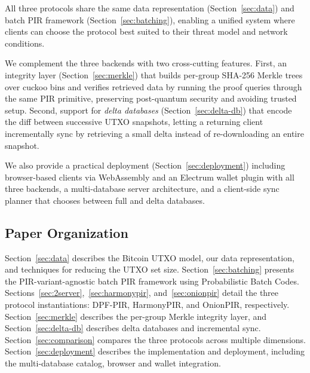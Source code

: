 All three protocols share the same data representation (Section~\ref{sec:data}) and batch PIR framework (Section~\ref{sec:batching}), enabling a unified system where clients can choose the protocol best suited to their threat model and network conditions.

We complement the three backends with two cross-cutting features. First, an integrity layer (Section~\ref{sec:merkle}) that builds per-group SHA-256 Merkle trees over cuckoo bins and verifies retrieved data by running the proof queries through the same PIR primitive, preserving post-quantum security and avoiding trusted setup. Second, support for \emph{delta databases} (Section~\ref{sec:delta-db}) that encode the diff between successive UTXO snapshots, letting a returning client incrementally sync by retrieving a small delta instead of re-downloading an entire snapshot.

We also provide a practical deployment (Section~\ref{sec:deployment}) including browser-based clients via WebAssembly \cite{wasm} and an Electrum wallet plugin \cite{electrum} with all three backends, a multi-database server architecture, and a client-side sync planner that chooses between full and delta databases.

\subsection{Paper Organization}

Section~\ref{sec:data} describes the Bitcoin UTXO model, our data representation, and techniques for reducing the UTXO set size. Section~\ref{sec:batching} presents the PIR-variant-agnostic batch PIR framework using Probabilistic Batch Codes. Sections~\ref{sec:2server},~\ref{sec:harmonypir}, and~\ref{sec:onionpir} detail the three protocol instantiations: DPF-PIR, HarmonyPIR, and OnionPIR, respectively. Section~\ref{sec:merkle} describes the per-group Merkle integrity layer, and Section~\ref{sec:delta-db} describes delta databases and incremental sync. Section~\ref{sec:comparison} compares the three protocols across multiple dimensions. Section~\ref{sec:deployment} describes the implementation and deployment, including the multi-database catalog, browser and wallet integration.
